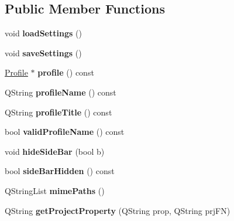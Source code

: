 \subsection*{Public Member Functions}
\begin{DoxyCompactItemize}
\item 
\hypertarget{classConfig_a96f704d539d03eb0cfd5ccc642b68468}{
void {\bfseries loadSettings} ()}
\label{classConfig_a96f704d539d03eb0cfd5ccc642b68468}

\item 
\hypertarget{classConfig_adbd02ecc097a3d86d0b340e5d5aef5e0}{
void {\bfseries saveSettings} ()}
\label{classConfig_adbd02ecc097a3d86d0b340e5d5aef5e0}

\item 
\hypertarget{classConfig_a9214ebe51049542c212cb478bfc8597f}{
\hyperlink{classProfile}{Profile} $\ast$ {\bfseries profile} () const }
\label{classConfig_a9214ebe51049542c212cb478bfc8597f}

\item 
\hypertarget{classConfig_a7f5bce56d51841d2181c370f5e804955}{
QString {\bfseries profileName} () const }
\label{classConfig_a7f5bce56d51841d2181c370f5e804955}

\item 
\hypertarget{classConfig_a79c27078d3f1aaf9fc9d3ee5754acad2}{
QString {\bfseries profileTitle} () const }
\label{classConfig_a79c27078d3f1aaf9fc9d3ee5754acad2}

\item 
\hypertarget{classConfig_ab0f34d50af9af1976856c32fe660f321}{
bool {\bfseries validProfileName} () const }
\label{classConfig_ab0f34d50af9af1976856c32fe660f321}

\item 
\hypertarget{classConfig_aa30063e16faa15c5dcbf20f0cd3643ab}{
void {\bfseries hideSideBar} (bool b)}
\label{classConfig_aa30063e16faa15c5dcbf20f0cd3643ab}

\item 
\hypertarget{classConfig_ac10d155df1462f849ceb287cc13e5bf0}{
bool {\bfseries sideBarHidden} () const }
\label{classConfig_ac10d155df1462f849ceb287cc13e5bf0}

\item 
\hypertarget{classConfig_adad178c421511aae1454dd2494387437}{
QStringList {\bfseries mimePaths} ()}
\label{classConfig_adad178c421511aae1454dd2494387437}

\item 
\hypertarget{classConfig_a51f56dd9bc09c163f9d9d1bbc67ff607}{
QString {\bfseries getProjectProperty} (QString prop, QString prjFN)}
\label{classConfig_a51f56dd9bc09c163f9d9d1bbc67ff607}


\end{DoxyCompactItemize}
